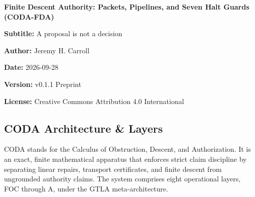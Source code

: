 \documentclass[
  11pt,
]{article}
\begin{document}
\begin{center}
{\Large\bfseries Finite Descent Authority: Packets, Pipelines, and Seven Halt Guards (CODA-FDA)}\par
\textbf{Subtitle:} A proposal is not a decision

\textbf{Author:} Jeremy H. Carroll

\textbf{Date:} 2026-09-28

\textbf{Version:} v0.1.1 Preprint

\textbf{License:} Creative Commons Attribution 4.0 International

\end{center}

\subsection{CODA Architecture \& Layers}\label{coda-architecture-layers}

CODA stands for the Calculus of Obstruction, Descent, and Authorization. It is an exact, finite mathematical apparatus that enforces strict claim discipline by separating linear repairs, transport certificates, and finite descent from ungrounded authority claims. The system comprises eight operational layers, FOC through A, under the GTLA meta-architecture.
\end{document}
